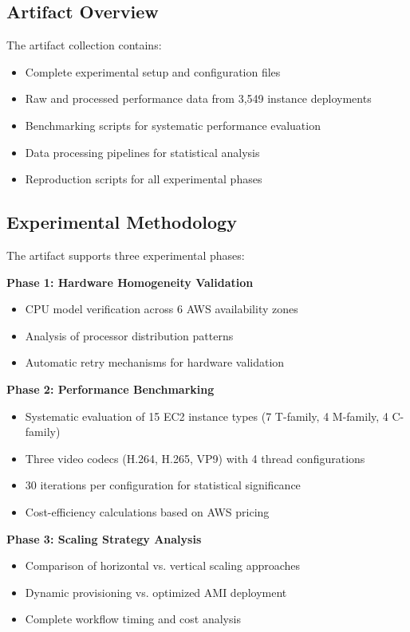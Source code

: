 \documentclass[conference]{IEEEtran}
\begin{document}
\subsection{Artifact Overview}

The artifact collection contains:

\begin{itemize}
	\item Complete experimental setup and configuration files
	\item Raw and processed performance data from 3,549 instance deployments
	\item Benchmarking scripts for systematic performance evaluation
	\item Data processing pipelines for statistical analysis
	\item Reproduction scripts for all experimental phases
\end{itemize}

\subsection{Experimental Methodology}

The artifact supports three experimental phases:

\textbf{Phase 1: Hardware Homogeneity Validation}
\begin{itemize}
	\item CPU model verification across 6 AWS availability zones
	\item Analysis of processor distribution patterns
	\item Automatic retry mechanisms for hardware validation
\end{itemize}

\textbf{Phase 2: Performance Benchmarking}
\begin{itemize}
	\item Systematic evaluation of 15 EC2 instance types (7 T-family, 4 M-family, 4 C-family)
	\item Three video codecs (H.264, H.265, VP9) with 4 thread configurations
	\item 30 iterations per configuration for statistical significance
	\item Cost-efficiency calculations based on AWS pricing
\end{itemize}

\textbf{Phase 3: Scaling Strategy Analysis}
\begin{itemize}
	\item Comparison of horizontal vs. vertical scaling approaches
	\item Dynamic provisioning vs. optimized AMI deployment
	\item Complete workflow timing and cost analysis
\end{itemize}
\end{document}
